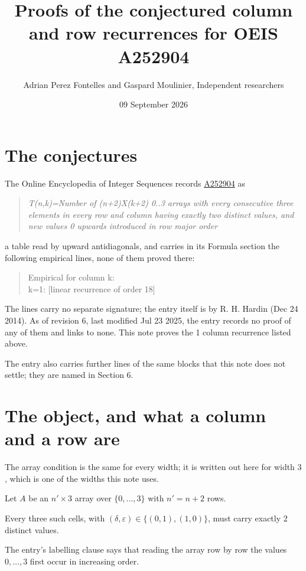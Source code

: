 \documentclass[11pt]{article}
\title{Proofs of the conjectured column and row recurrences for OEIS A252904}
\author{Adrian Perez Fontelles and Gaspard Moulinier, Independent researchers}
\date{09 September 2026}
\theoremstyle{definition}
\begin{document}
\maketitle
\section{The conjectures}

The Online Encyclopedia of Integer Sequences records \href{https://oeis.org/A252904}{A252904} as

\begin{quote}\itshape T(n,k)=Number of (n+2)X(k+2) 0..3 arrays with every consecutive three elements in every row and column having exactly two distinct values, and new values 0 upwards introduced in row major order\end{quote}

a table read by upward antidiagonals, and carries in its Formula section the following empirical lines, none of them proved there:

\begin{quote}\ttfamily Empirical for column k:\\
k=1: [linear recurrence of order 18]\end{quote}

The lines carry no separate signature; the entry itself is by R. H. Hardin (Dec 24 2014). As of revision 6, last modified Jul 23 2025, the entry records no proof of any of them and links to none. This note proves the 1 column recurrence listed above.

The entry also carries further lines of the same blocks that this note does not settle; they are named in Section 6.

\section{The object, and what a column and a row are}

The array condition is the same for every width; it is written out here for width $3$, which is one of the widths this note uses.

Let $A$ be an $n' \times 3$ array over $\{0,\dots,3\}$ with $n' = n + 2$ rows.

Every three such cells, with $(\delta,\varepsilon) \in \{(0,1), (1,0)\}$, must carry exactly $2$ distinct values.

The entry's labelling clause says that reading the array row by row the values $0,\dots,3$ first occur in increasing order.
\end{document}
